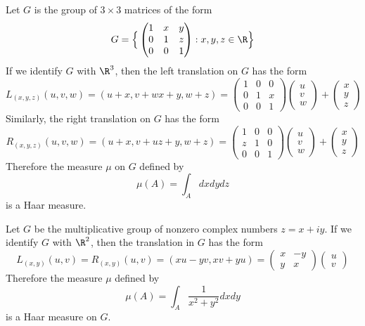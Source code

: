 \begin{example}\label{Haar measure upper unit triangle}
Let $G$ is the group of $3\times 3$ matrices of the form
\[G=\Big\{\begin{pmatrix}
1&x&y\\
0&1&z\\
0&0&1
\end{pmatrix}:x,y,z\in\R\Big\}\]
If we identify $G$ with $\R^3$, then the left translation on $G$ has the form
\[L_{(x,y,z)}(u,v,w)=(u+x,v+wx+y,w+z)=\begin{pmatrix}
1&0&0\\
0&1&x\\
0&0&1
\end{pmatrix}\begin{pmatrix}
u\\
v\\
w
\end{pmatrix}+\begin{pmatrix}
x\\
y\\
z
\end{pmatrix}\]
Similarly, the right translation on $G$ has the form
\[R_{(x,y,z)}(u,v,w)=(u+x,v+uz+y,w+z)=\begin{pmatrix}
1&0&0\\
z&1&0\\
0&0&1
\end{pmatrix}\begin{pmatrix}
u\\
v\\
w
\end{pmatrix}+\begin{pmatrix}
x\\
y\\
z
\end{pmatrix}\]
Therefore the measure $\mu$ on $G$ defined by
\[\mu(A)=\int_Adxdydz\]
is a Haar measure.
\end{example}
\begin{example}\label{Haar measure complex number}
Let $G$ be the multiplicative group of nonzero complex numbers $z=x+iy$. If we identify $G$ with $\R^2$, then the translation in $G$ has the form
\[L_{(x,y)}(u,v)=R_{(x,y)}(u,v)=(xu-yv,xv+yu)=\begin{pmatrix}
x&-y\\
y&x
\end{pmatrix}\begin{pmatrix}
u\\
v
\end{pmatrix}\]
Therefore the measure $\mu$ defined by
\[\mu(A)=\int_A\frac{1}{x^2+y^2}dxdy\]
is a Haar measure on $G$. 
\end{example}
